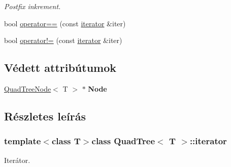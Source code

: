 \begin{DoxyCompactItemize}
\begin{DoxyCompactList}\small\item\em Postfix inkrement. \end{DoxyCompactList}\item 
bool \hyperlink{class_quad_tree_1_1iterator_a73eef33266569624d3993667207d5b33}{operator==} (const \hyperlink{class_quad_tree_1_1iterator}{iterator} \&iter)
\item 
bool \hyperlink{class_quad_tree_1_1iterator_a145ee8bf74eee73d17bac0ab06565868}{operator!=} (const \hyperlink{class_quad_tree_1_1iterator}{iterator} \&iter)
\end{DoxyCompactItemize}
\subsection*{Védett attribútumok}
\begin{DoxyCompactItemize}
\item 
\hypertarget{class_quad_tree_1_1iterator_aaa9d5117878bb8b3ff0197f8756eb726}{\hyperlink{class_quad_tree_node}{Quad\-Tree\-Node}$<$ T $>$ $\ast$ {\bfseries Node}}\label{class_quad_tree_1_1iterator_aaa9d5117878bb8b3ff0197f8756eb726}

\end{DoxyCompactItemize}


\subsection{Részletes leírás}
\subsubsection*{template$<$class T$>$class Quad\-Tree$<$ T $>$\-::iterator}

Iterátor. 

